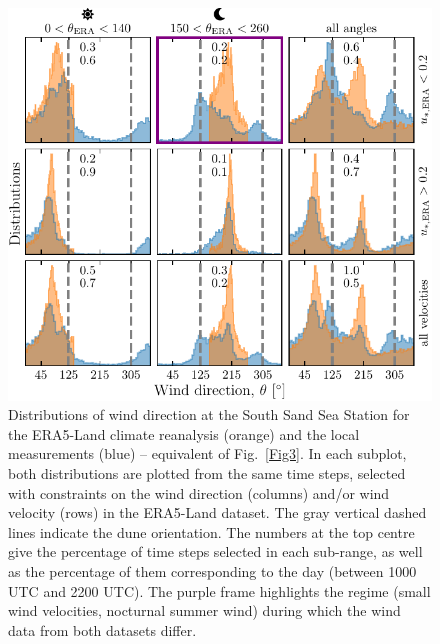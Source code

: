 \begin{figure}[p]
\centering
\includegraphics[scale=1]{Figures/Figure8_supp.pdf}
\caption{Distributions of wind direction at the South Sand Sea Station for the ERA5-Land climate reanalysis (orange) and the local measurements (blue) -- equivalent of Fig.~\ref{Fig3}. In each subplot, both distributions are plotted from the same time steps, selected with constraints on the wind direction (columns) and/or wind velocity (rows) in the ERA5-Land dataset. The gray vertical dashed lines indicate the dune orientation. The numbers at the top centre give the percentage of time steps selected in each sub-range, as well as the percentage of them corresponding to the day (between 1000 UTC and 2200 UTC). The purple frame highlights the regime (small wind velocities, nocturnal summer wind) during which the wind data from both datasets differ.}
\label{Fig8_supp}
\end{figure}

